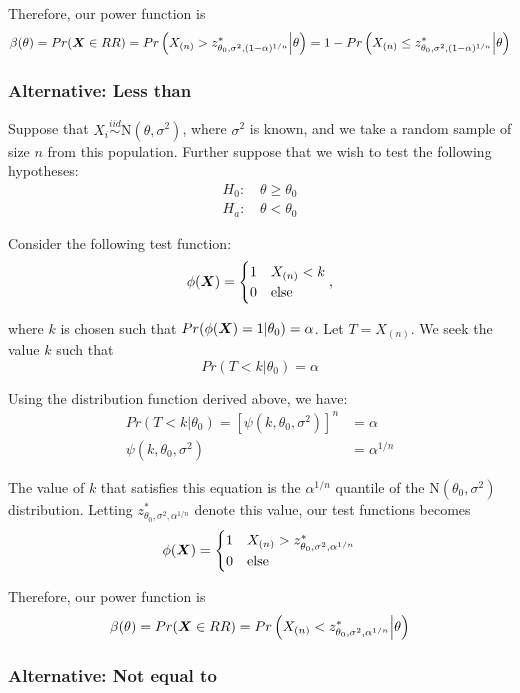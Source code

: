 \documentclass[]{article}
\newcommand{\bfX}{\mbox{\boldmath $X$}}
\begin{document}
Therefore, our power function is
\[
\beta(\theta) = Pr(\bfX \in RR) = Pr\left(X_{(n)} > z^*_{\theta_0, \sigma^2, (1 - \alpha)^{1/n}}\Big| \theta\right) = 1 - Pr\left(X_{(n)}\leq z^*_{\theta_0, \sigma^2, (1 - \alpha)^{1/n}} \Big| \theta\right)
\]

\subsubsection{Alternative: Less than}

Suppose that $X_i \stackrel{iid}{\sim} \text{N}(\theta, \sigma^2)$, where $\sigma^2$ is known, and we take a random sample of size $n$ from this population. Further suppose that we wish to test the following hypotheses:
\[
\begin{split}
\text{$H_0$: }& \theta \geq \theta_0 \\
\text{$H_a$: }& \theta < \theta_0
\end{split}
\]

Consider the following test function:
\[
\phi(\bfX) = \begin{cases}
1 & X_{(n)} < k \\
0 & \text{else}
\end{cases},
\]

where $k$ is chosen such that $Pr(\phi(\bfX) = 1|\theta_0) = \alpha$. Let $T = X_{(n)}$. We seek the value $k$ such that 
\[
Pr(T < k | \theta_0) = \alpha
\]

Using the distribution function derived above, we have:
\[
\begin{split}
Pr(T < k | \theta_0) = [\psi(k, \theta_0, \sigma^2)]^n &= \alpha \\
\psi(k, \theta_0, \sigma^2) &= \alpha^{1/n}
\end{split}
\]

The value of $k$ that satisfies this equation is the $\alpha^{1/n}$ quantile of the $\text{N}(\theta_0, \sigma^2)$ distribution. Letting $z^*_{\theta_0, \sigma^2, \alpha^{1/n}}$ denote this value, our test functions becomes
\[
\phi(\bfX) = \begin{cases}
1 & X_{(n)} > z^*_{\theta_0, \sigma^2, \alpha^{1/n}} \\
0 & \text{else}
\end{cases}
\]

Therefore, our power function is
\[
\beta(\theta) = Pr(\bfX \in RR) = Pr\left(X_{(n)} < z^*_{\theta_0, \sigma^2, \alpha^{1/n}}\Big| \theta\right) 
\]

\subsubsection{Alternative: Not equal to}
\end{document}
